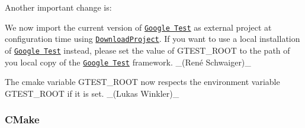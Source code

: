 Another important change is\+:


\begin{DoxyItemize}
\item We now import the current version of \href{https://github.com/google/googletest}{\tt Google Test} as external project at configuration time using \href{https://github.com/Crascit/DownloadProject}{\tt Download\+Project}. If you want to use a local installation of \href{https://github.com/google/googletest}{\tt Google Test} instead, please set the value of {\ttfamily G\+T\+E\+S\+T\+\_\+\+R\+O\+OT} to the path of you local copy of the \href{https://github.com/google/googletest}{\tt Google Test} framework. \+\_\+(René Schwaiger)\+\_\+
\item The cmake variable {\ttfamily G\+T\+E\+S\+T\+\_\+\+R\+O\+OT} now respects the environment variable {\ttfamily G\+T\+E\+S\+T\+\_\+\+R\+O\+OT} if it is set. \+\_\+(\+Lukas Winkler)\+\_\+
\end{DoxyItemize}

\subsubsection*{C\+Make}


